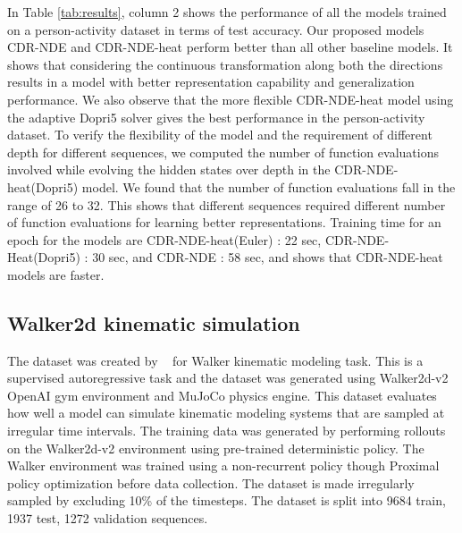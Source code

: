 \documentclass{article} %
\begin{document}
In Table \ref{tab:results}, column 2 shows the performance of all the models trained on a person-activity dataset in terms of test accuracy. Our proposed models CDR-NDE and CDR-NDE-heat perform better than all  other baseline models. It shows that considering the continuous transformation along both the directions results in a model with better representation capability and generalization performance. We also observe that the more flexible CDR-NDE-heat model using the adaptive Dopri5 solver gives the best performance in the person-activity dataset.  To verify the flexibility of the model and the  requirement of  different depth for different sequences,  we computed the number of function evaluations involved while evolving the hidden states over depth in the CDR-NDE-heat(Dopri5) model. We found that the number of function evaluations fall in the range of 26 to 32.   This shows that different sequences required different number of function evaluations for learning better representations. Training time for an epoch for the models are CDR-NDE-heat(Euler) : 22 sec, CDR-NDE-Heat(Dopri5) : 30 sec, and CDR-NDE : 58 sec, and shows that CDR-NDE-heat models are faster. 

\subsection{Walker2d kinematic simulation} 
The dataset was created by ~\citep{lechner2020learning}  for Walker kinematic modeling task. This is a supervised autoregressive task and the dataset was generated using Walker2d-v2 OpenAI gym environment and MuJoCo physics engine. This dataset evaluates how well a model can simulate kinematic modeling systems that are sampled at irregular time intervals. The training data was generated by performing rollouts on the Walker2d-v2 environment using pre-trained deterministic policy. The Walker environment was trained using a non-recurrent policy though Proximal policy optimization before data collection. The dataset is made irregularly sampled by excluding 10\% of the timesteps. %
The dataset is split into 9684 train, 1937 test, 1272 validation sequences. 
 

\end{document}
